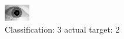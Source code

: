 \begin{figure}[h!]
\begin{center}
\includegraphics[width=0.60\columnwidth]{figures/ID1640_class_3_target_2.png}
\end{center}
\caption{ Classification: 3 actual target: 2}
\label{fig:ID1640_class_3_target_2}
\end{figure}
